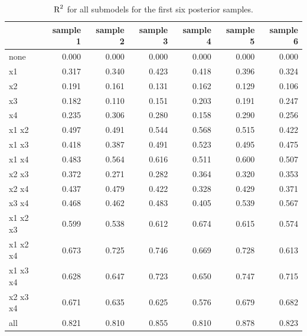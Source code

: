 \documentclass[11pt,a4paper,twoside]{book}\usepackage[]{graphicx}\usepackage[]{color}
\newenvironment{knitrout}{}{} %
\begin{document}
\begin{knitrout}
\color{fgcolor}\begin{table}

\caption{\label{tab:simdata.postsample3}$ \text{R}^2$ for all submodels for the first six posterior samples.}
\centering
\begin{tabular}[t]{lrrrrrr}
\toprule
  & sample 1 & sample 2 & sample 3 & sample 4 & sample 5 & sample 6\\
\midrule
none & 0.000 & 0.000 & 0.000 & 0.000 & 0.000 & 0.000\\
x1 & 0.317 & 0.340 & 0.423 & 0.418 & 0.396 & 0.324\\
x2 & 0.191 & 0.161 & 0.131 & 0.162 & 0.129 & 0.106\\
x3 & 0.182 & 0.110 & 0.151 & 0.203 & 0.191 & 0.247\\
x4 & 0.235 & 0.306 & 0.280 & 0.158 & 0.290 & 0.256\\
x1 x2 & 0.497 & 0.491 & 0.544 & 0.568 & 0.515 & 0.422\\
x1 x3 & 0.418 & 0.387 & 0.491 & 0.523 & 0.495 & 0.475\\
x1 x4 & 0.483 & 0.564 & 0.616 & 0.511 & 0.600 & 0.507\\
x2 x3 & 0.372 & 0.271 & 0.282 & 0.364 & 0.320 & 0.353\\
x2 x4 & 0.437 & 0.479 & 0.422 & 0.328 & 0.429 & 0.371\\
x3 x4 & 0.468 & 0.462 & 0.483 & 0.405 & 0.539 & 0.567\\
x1 x2 x3 & 0.599 & 0.538 & 0.612 & 0.674 & 0.615 & 0.574\\
x1 x2 x4 & 0.673 & 0.725 & 0.746 & 0.669 & 0.728 & 0.613\\
x1 x3 x4 & 0.628 & 0.647 & 0.723 & 0.650 & 0.747 & 0.715\\
x2 x3 x4 & 0.671 & 0.635 & 0.625 & 0.576 & 0.679 & 0.682\\
all & 0.821 & 0.810 & 0.855 & 0.810 & 0.878 & 0.823\\
\bottomrule
\end{tabular}
\end{table}


\end{knitrout}
\end{document}
